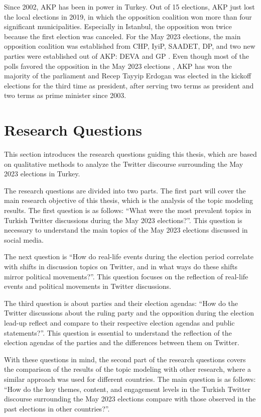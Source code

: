 Since 2002, \ac{AKP} has been in power in Turkey. Out of 15 elections, \ac{AKP} just lost the 
local elections in 2019, in which the opposition coalition won more than four significant municipalities. 
Especially in Istanbul, the opposition won twice because the first election was canceled. 
For the May 2023 elections, the main opposition coalition was established from \ac{CHP}, \ac{IyiP}, \ac{SAADET}, 
\ac{DP}, and two new parties were established out of \ac{AKP}: \ac{DEVA} and \ac{GP} 
\parencite{Atila_medyascope_tr_secim_tarihi_2022}. 
Even though most of the polls favored the opposition in the May 2023 elections 
\parencite{Saç_Çoban_teyit_anketler_2023}, \ac{AKP} has won the majority of the parliament and 
Recep Tayyip Erdogan was elected in the kickoff elections for the third time as president, after serving 
two terms as president and two terms as prime minister since 2003.

\section{Research Questions}

This section introduces the research questions guiding this thesis,
which are based on qualitative methods to analyze the Twitter discourse surrounding the May 2023 elections in Turkey.


The research questions are divided into two parts.
The first part will cover the main research objective of this thesis, 
which is the analysis of the topic modeling results. The first question is as follows:
``What were the most prevalent topics in Turkish Twitter discussions during the May 2023 elections?''.
This question is necessary to understand the main topics of the May 2023 elections discussed in social media.

The next question is ``How do real-life events during the election period correlate with shifts in discussion topics on Twitter, 
and in what ways do these shifts mirror political movements?''.
This question focuses on the reflection of real-life events and political movements in Twitter discussions. 

The third question is about parties and their election agendas: 
``How do the Twitter discussions about the ruling party and the opposition during the election lead-up reflect and compare 
to their respective election agendas and public statements?''.
This question is essential to understand the reflection of the election agendas of the parties and the differences between them on Twitter.

With these questions in mind, the second part of the research questions covers the comparison of the results of the topic modeling
with other research, where a similar approach was used for different countries.
The main question is as follows: 
``How do the key themes, content, and engagement levels in the Turkish Twitter discourse surrounding the May 2023 elections
 compare with those observed in the past elections in other countries?''.
